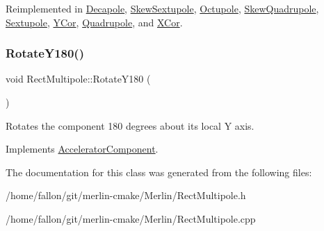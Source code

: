 Reimplemented in \hyperlink{classDecapole_a7fd7331bfbc39982539f8077afef2e6e}{Decapole}, \hyperlink{classSkewSextupole_a8700a80f9f1863d5f6966cf0827ed342}{Skew\+Sextupole}, \hyperlink{classOctupole_a646ac61a3ef6a66e987df0364d8bb465}{Octupole}, \hyperlink{classSkewQuadrupole_ac277fd65922256a16c1d2774254c09d2}{Skew\+Quadrupole}, \hyperlink{classSextupole_a7059ddac1812040330950de346e22f48}{Sextupole}, \hyperlink{classYCor_a6d5d11f3128222ae114d250a2f7d62bb}{Y\+Cor}, \hyperlink{classQuadrupole_aa0160bdc8c7be3d48e400a9698907b15}{Quadrupole}, and \hyperlink{classXCor_abd5e017ea4191ee86f141d72979f90d2}{X\+Cor}.

\mbox{\label{classRectMultipole_afa249ac1d4f3b6c8c1171e5586731ffd}} 
\subsubsection{\texorpdfstring{Rotate\+Y180()}{RotateY180()}}
{\footnotesize\ttfamily void Rect\+Multipole\+::\+Rotate\+Y180 (\begin{DoxyParamCaption}{ }\end{DoxyParamCaption})\hspace{0.3cm}{\ttfamily [virtual]}}

Rotates the component 180 degrees about its local Y axis. 

Implements \hyperlink{classAcceleratorComponent_a8bf0d39b56578ca99f286ca1504b9072}{Accelerator\+Component}.



The documentation for this class was generated from the following files\+:\begin{DoxyCompactItemize}
\item 
/home/fallon/git/merlin-\/cmake/\+Merlin/Rect\+Multipole.\+h\item 
/home/fallon/git/merlin-\/cmake/\+Merlin/Rect\+Multipole.\+cpp\end{DoxyCompactItemize}
